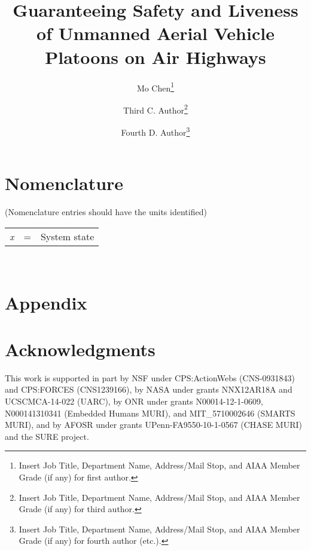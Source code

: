 \documentclass[letterpaper]{AIAA}
\begin{document}
\title{Guaranteeing Safety and Liveness of Unmanned Aerial Vehicle Platoons on Air Highways}

\author{Mo Chen\footnote{Insert Job Title, Department Name, Address/Mail Stop, and AIAA Member Grade (if any) for first author.}}
\author{Third C. Author\footnote{Insert Job Title, Department Name, Address/Mail Stop, and AIAA Member Grade (if any) for third author.}}
\author{Fourth D. Author\footnote{Insert Job Title, Department Name, Address/Mail Stop, and AIAA Member Grade (if any) for fourth author (etc.).}}

\begin{abstract}
\end{abstract}

\maketitle

\section*{Nomenclature}
(Nomenclature entries should have the units identified)\\
\noindent\begin{tabular}{@{}lcl@{}}
\textit{x}  &=& System state \\
\end{tabular} \\














\section*{Appendix}

\section*{Acknowledgments}
This work is supported in part by NSF under CPS:ActionWebs (CNS-0931843) and CPS:FORCES (CNS1239166), by NASA under grants NNX12AR18A and UCSCMCA-14-022 (UARC), by ONR under grants N00014-12-1-0609, N000141310341 (Embedded Humans MURI), and MIT\_5710002646 (SMARTS MURI), and by AFOSR under grants UPenn-FA9550-10-1-0567 (CHASE MURI) and the SURE project.
\end{document}

